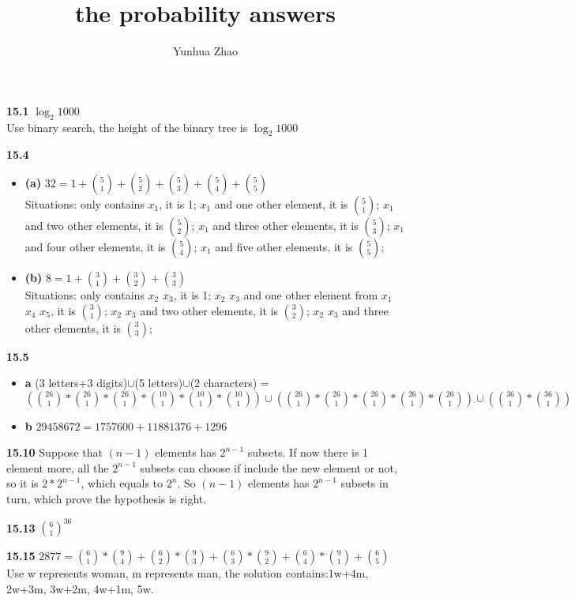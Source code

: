 \documentclass{report}
\author{Yunhua Zhao}
\title{the probability answers}
\begin{document}
\maketitle


\textbf{15.1}  $\log_{2}1000$  \\
Use binary search, the height of the binary tree is $\log_{2}1000$

\textbf{15.4}
\begin{itemize}
	\item \textbf{(a)} $32 = 1+{5 \choose 1}+{5 \choose 2}+{5 \choose 3}+{5 \choose 4}+{5 \choose 5}$  \\
	Situations: only contains $x_1$, it is 1; $x_1$ and one other element, it is ${5 \choose 1}$; $x_1$ and two other elements, it is ${5 \choose 2}$; $x_1$ and three other elements, it is ${5 \choose 3}$; $x_1$ and four other elements, it is ${5 \choose 4}$; $x_1$ and five other elements, it is ${5 \choose 5}$; 
	\item \textbf{(b)} $8 = 1+{3 \choose 1}+{3 \choose 2}+{3 \choose 3}$  \\
	Situations: only contains $x_2$ $x_3$, it is 1; $x_2$ $x_3$ and one other element from $x_1$ $x_4$ $x_5$, it is ${3 \choose 1}$; $x_2$ $x_3$ and two other elements, it is ${3 \choose 2}$; $x_2$ $x_3$ and three other elements, it is ${3 \choose 3}$;
\end{itemize}

\textbf{15.5}
\begin{itemize}
	\item \textbf{a} (3 letters+3 digits)$\cup$(5 letters)$\cup$(2 characters) = $({26 \choose 1}*{26 \choose 1}*{26 \choose 1}*{10 \choose 1}*{10 \choose 1}*{10 \choose 1}) \cup ({26 \choose 1}*{26 \choose 1}*{26 \choose 1}*{26 \choose 1}*{26 \choose 1}) \cup ({36 \choose 1}*{36 \choose 1})$
	\item \textbf{b} $29458672=1757600+11881376+1296$
\end{itemize}

\textbf{15.10}  Suppose that $(n-1)$ elements has $2^{n-1}$ subsets. If now there is 1 element more, all the $2^{n-1}$ subsets can choose if  include the new element or not, so it is  $2*2^{n-1}$, which equals to $2^n$. So $(n-1)$ elements has $2^{n-1}$ subsets in turn, which prove the hypothesis is right.

\textbf{15.13} ${6 \choose 1}^{36}$

\textbf{15.15} $2877={6 \choose 1}*{9 \choose 4}+{6 \choose 2}*{9 \choose 3}+{6 \choose 3}*{9 \choose 2}+{6 \choose 4}*{9 \choose 1}+{6 \choose 5}$  \\
Use w represents woman, m represents man, the solution contains:1w+4m, 2w+3m, 3w+2m, 4w+1m, 5w.
\end{document}

